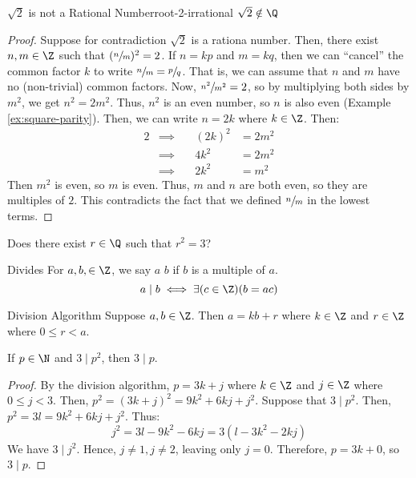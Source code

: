\begin{thmbox}{$\sqrt{2}$ is not a Rational Number}{root-2-irrational}
    $\sqrt{2} \notin \Q$
    \tcblower
    \begin{proof}
        Suppose for contradiction $\sqrt{2}$ is a rationa number. Then, there exist $n,m \in \Z$ such that $(\sfrac{n}{m})^2 = 2$. If $n = kp$ and $m = kq$, then we can ``cancel'' the common factor $k$ to write $\sfrac{n}{m} = \sfrac{p}{q}$. That is, we can assume that $n$ and $m$ have no (non-trivial) common factors. Now, $\sfrac{n^2}{m^2} = 2$, so by multiplying both sides by $m^2$, we get $n^2 = 2m^2$. Thus, $n^2$ is an even number, so $n$ is also even (Example \ref{ex:square-parity}). Then, we can write $n = 2k$ where $k \in \Z$. Then:
            \begin{alignat*}{2}
                & \implies \quad & (2k)^2 &= 2m^2 \\
                & \implies \quad & 4k^2 &= 2m^2 \\
                & \implies \quad & 2k^2 &= m^2
            \end{alignat*}
            Then $m^2$ is even, so $m$ is even. Thus, $m$ and $n$ are both even, so they are multiples of $2$. This contradicts the fact that we defined $\sfrac{n}{m}$ in the lowest terms.
    \end{proof}
\end{thmbox}

Does there exist $r \in \Q$ such that $r^2 = 3$?

\begin{dfnbox}{Divides}{}
    For $a,b, \in \Z$, we say $a$  $b$ if $b$ is a multiple of $a$.
    \tcblower
    \[ a \mid b \iff \exists(c \in \Z)(b=ac) \]
\end{dfnbox}

\begin{thmbox}{Division Algorithm}{}
    Suppose $a,b \in \Z$. Then $a = kb + r$ where $k \in \Z$ and $r \in \Z$ where $0 \leq r < a$.
\end{thmbox}

\begin{exbox}{}{}
    If $p \in \N$ and $3 \mid p^2$, then $3 \mid p$.
    \tcblower
    \begin{proof}
        By the division algorithm, $p = 3k+j$ where $k \in \Z$ and $j \in \Z$ where $0 \leq j < 3$. Then, $p^2 = (3k+j)^2 = 9k^2 + 6kj + j^2$. Suppose that $3 \mid p^2$. Then, $p^2 = 3l = 9k^2 + 6kj + j^2$. Thus:
        \[ j^2 = 3l-9k^2-6kj = 3(l-3k^2-2kj) \]
        We have $3 \mid j^2$. Hence, $j \neq 1, j \neq 2$, leaving only $j = 0$. Therefore, $p = 3k + 0$, so $3 \mid p$.
    \end{proof}
\end{exbox}

